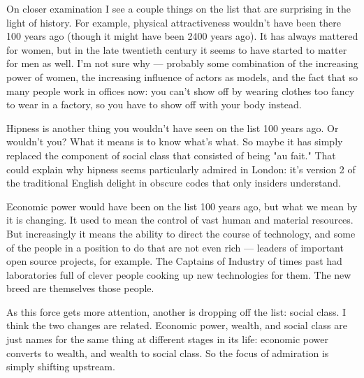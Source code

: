 On closer examination I see a couple things
                  on the list that are surprising in the light of history. For
                  example, physical attractiveness wouldn't have been there 100
                  years ago (though it might have been 2400 years ago). It has
                  always mattered for women, but in the late twentieth century
                  it seems to have started to matter for men as well. I'm not
                  sure why --- probably some combination of the increasing
                  power of women, the increasing influence of actors as models,
                  and the fact that so many people work in offices now: you
                  can't show off by wearing clothes too fancy to wear in a
                  factory, so you have to show off with your body instead.

Hipness
                  is another thing you wouldn't have seen on the list 100 years
                  ago. Or wouldn't you? What it means is to know what's what. So
                  maybe it has simply replaced the component of social class
                  that consisted of being "au fait." That could explain why
                  hipness seems particularly admired in London: it's version 2
                  of the traditional English delight in obscure codes that only
                  insiders understand.

Economic power would have been
                  on the list 100 years ago, but what we mean by it is changing.
                  It used to mean the control of vast human and material
                  resources. But increasingly it means the ability to direct the
                  course of technology, and some of the people in a position to
                  do that are not even rich --- leaders of important open
                  source projects, for example. The Captains of Industry of
                  times past had laboratories full of clever people cooking up
                  new technologies for them. The new breed are themselves those
                  people.

As this force gets more attention, another
                  is dropping off the list: social class. I think the two
                  changes are related. Economic power, wealth, and social class
                  are just names for the same thing at different stages in its
                  life: economic power converts to wealth, and wealth to social
                  class. So the focus of admiration is simply shifting
                  upstream.


